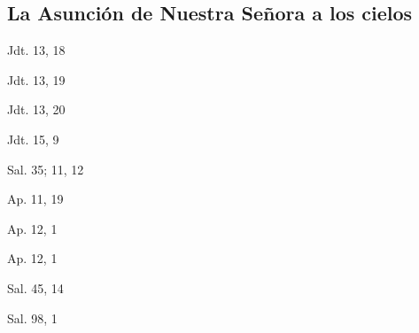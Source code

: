 \documentclass[a4paper,11pt]{article}
\begin{document}
    \subsection*{\hfil La Asunción de Nuestra Señora a los cielos \hfil}
      \begin{flushright}
        Jdt. 13, 18
      \end{flushright}      
      \begin{flushright}
        Jdt. 13, 19
      \end{flushright}      
      \begin{flushright}
        Jdt. 13, 20
      \end{flushright}      
      \begin{flushright}
        Jdt. 15, 9
      \end{flushright}      
      \begin{flushright}
        Sal. 35; 11, 12
      \end{flushright}      
      \begin{flushright}
        Ap. 11, 19
      \end{flushright}      
      \begin{flushright}
        Ap. 12, 1
      \end{flushright}      
      \begin{flushright}
        Ap. 12, 1
      \end{flushright}      
      \begin{flushright}
        Sal. 45, 14
      \end{flushright}      
      \begin{flushright}
        Sal. 98, 1
      \end{flushright}
\end{document}
